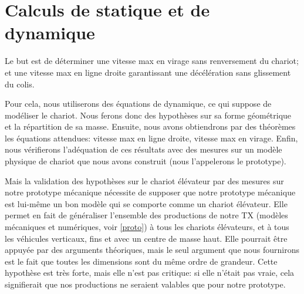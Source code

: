 \section{Calculs de statique et de dynamique}
\label{meca}
Le but est de déterminer une vitesse max en virage sans renversement du chariot; et une vitesse max en ligne droite garantissant une décélération sans glissement du colis.

Pour cela, nous utiliserons des équations de dynamique, ce qui suppose de modéliser le chariot. Nous ferons donc des hypothèses sur sa forme géométrique et la répartition de sa masse. Ensuite, nous avons obtiendrons par des théorèmes les équations attendues: vitesse max en ligne droite, vitesse max en virage. Enfin, nous vérifierons l'adéquation de ces résultats avec des mesures sur un modèle physique de chariot que nous avons construit (nous l'appelerons le prototype).

\label{hypProtoCommeChariot}
Mais la validation des hypothèses sur le chariot élévateur par des mesures sur notre prototype mécanique nécessite de supposer que notre prototype mécanique est lui-même un bon modèle qui se comporte comme un chariot élévateur. Elle permet en fait de généraliser l'ensemble des productions de notre TX (modèles mécaniques et numériques, voir \ref{proto}) à tous les chariots élévateurs, et à tous les véhicules verticaux, fins et avec un centre de masse haut. Elle pourrait être appuyée par des arguments théoriques, mais le seul argument que nous fournirons est le fait que toutes les dimensions sont du même ordre de grandeur. Cette hypothèse est très forte, mais elle n'est pas critique: si elle n'était pas vraie, cela signifierait que nos productions ne seraient valables que pour notre prototype.

